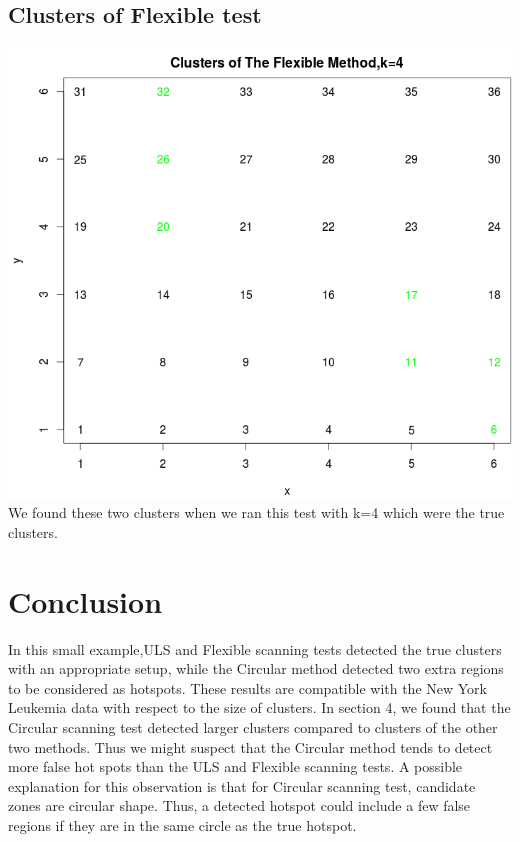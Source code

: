 \documentclass[12pt]{article}
\begin{document}
	\subsection{Clusters of Flexible test} 
	 \includegraphics[scale=0.4]{test_3} \\ We found these two clusters when we ran this test with k=4 which were the true clusters.\\ 


\section{Conclusion}

In this small example,ULS and Flexible scanning tests detected the true clusters with an appropriate setup, while the Circular method detected two extra regions to be considered as hotspots. These results are compatible with the New York Leukemia data with respect to the size of clusters. In section 4, we found that the Circular scanning test detected larger clusters compared to clusters of the other two methods. Thus we might suspect that the Circular method tends to detect more false hot spots than the ULS and Flexible scanning tests. A possible explanation for this observation is that for Circular scanning test, candidate zones are circular shape. Thus, a detected hotspot could include a few false regions if they are in the same circle as the true hotspot.\\  
\end{document}
